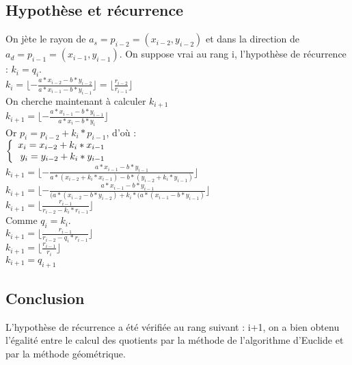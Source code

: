 \documentclass{article}
\begin{document}
\subsection{Hypothèse et récurrence}

On jète le rayon de $a_s = p_{i-2} = (x_{i-2},y_{i-2})$ et dans la direction de $a_d = p_{i-1} = (x_{i-1},y_{i-1})$. On suppose vrai au rang i, l'hypothèse de récurrence : $k_i = q_i$. \\

$k_i = \lfloor - \frac{a*x_{i-2} - b*y_{i-2}}{a*x_{i-1} - b*y_{i-1}} \rfloor = \lfloor \frac{r_{i-2}}{r_{i-1}} \rfloor$\\

On cherche maintenant à calculer $k_{i+1}$\\

$k_{i+1} = \lfloor - \frac{a*x_{i-1} - b*y_{i-1}}{a*x_{i} - b*y_{i}} \rfloor$\\

Or $p_{i} = p_{i-2} + k_{i} * p_{i-1}$, d'où :\\
$
\left \{
\begin{array}{r c l}
  x_{i} = x_{i-2} + k_{i} * x_{i-1}\\
  y_{i} = y_{i-2} + k_{i} * y_{i-1}
\end{array}
\right .
$\\

$k_{i+1} = \lfloor - \frac{a*x_{i-1} - b*y_{i-1}}{a*(x_{i-2} + k_{i} * x_{i-1}) - b*(y_{i-2} + k_{i} * y_{i-1})} \rfloor$\\
$k_{i+1} = \lfloor - \frac{a*x_{i-1} - b*y_{i-1}}{(a*(x_{i-2} - b*y_{i-2}) + k_{i} * (a*(x_{i-1} - b*y_{i-1})} \rfloor$\\
$k_{i+1} = \lfloor \frac{r_{i-1}}{r_{i-2} - k_{i} * r_{i-1}} \rfloor$\\

Comme $q_i = k_i$. \\

$k_{i+1} = \lfloor \frac{r_{i-1}}{r_{i-2} - q_{i} * r_{i-1}} \rfloor$\\
$k_{i+1} = \lfloor \frac{r_{i-1}}{r_{i}} \rfloor$\\

$k_{i+1} = q_{i+1}$

\subsection{Conclusion}

L'hypothèse de récurrence a été vérifiée au rang suivant : i+1, on a bien obtenu l'égalité entre le calcul des quotients par la méthode de l'algorithme d'Euclide et par la méthode géométrique.
\end{document}
